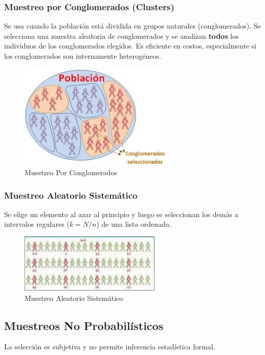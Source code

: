 \documentclass[12pt, letterpaper]{article}
\begin{document}
\subsubsection{Muestreo por Conglomerados (Clusters)}
Se usa cuando la población está dividida en grupos naturales (conglomerados). Se selecciona una muestra aleatoria de conglomerados y se analizan \textbf{todos} los individuos de los conglomerados elegidos. Es eficiente en costos, especialmente si los conglomerados son internamente heterogéneos.
\begin{figure}[htbp]
    \centering
    \includegraphics[width=0.65\textwidth]{MPC}
    \caption{Muestreo Por Conglomerados}
    \label{fig:MPC}
\end{figure}


\subsubsection{Muestreo Aleatorio Sistemático}
Se elige un elemento al azar al principio y luego se seleccionan los demás a intervalos regulares ($k=N/n$) de una lista ordenada.
\begin{figure}[htbp]
    \centering
    \includegraphics[width=0.6\textwidth]{MASIS}
    \caption{Muestreo Aleatorio Sistemático}
    \label{fig:MASIS}
\end{figure}
\newpage

\subsection{Muestreos No Probabilísticos}
La selección es subjetiva y no permite inferencia estadística formal.
\end{document}
